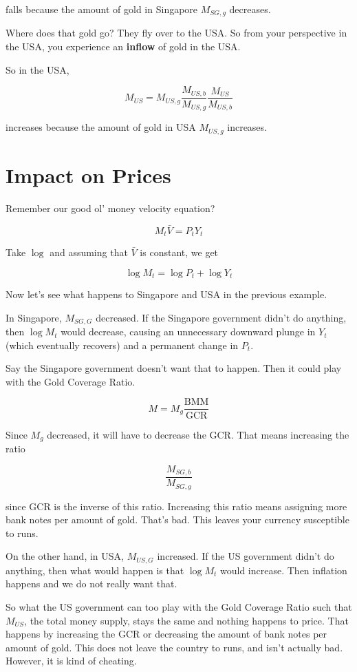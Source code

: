\documentclass[11pt]{scrartcl}
\begin{document}
falls because the amount of gold in Singapore $M_{SG,g}$ decreases. 

Where does that gold go? They fly over to the USA. So from your perspective in the USA, you experience an \textbf{inflow} of gold in the USA.

So in the USA,

\[ M_{US} = M_{US,g} \frac{M_{US,b}}{M_{US,g}} \frac{M_{US}}{M_{US,b}} \] 

increases because the amount of gold in USA $M_{US,g}$ increases.

\section{Impact on Prices}

Remember our good ol' money velocity equation?

\[ M_t \bar{V} = P_t Y_t\]

Take $\log$ and assuming that $\bar{V}$ is constant, we get

\[\log{M_t} = \log{P_t} + \log{Y_t} \]

Now let's see what happens to Singapore and USA in the previous example.

In Singapore, $M_{SG,G}$ decreased. If the Singapore government didn't do anything, then $\log{M_t}$ would decrease, causing an unnecessary downward plunge in $Y_t$ (which eventually recovers) and a permanent change in $P_t$. 

Say the Singapore government doesn't want that to happen. Then it could play with the Gold Coverage Ratio. 

\[  M = M_g \frac{\mathrm{BMM}}{\mathrm{GCR}} \]

Since $M_g$ decreased, it will have to decrease the GCR. That means increasing the ratio

\[  \frac{M_{SG,b}}{M_{SG,g}} \] 

since GCR is the inverse of this ratio. Increasing this ratio means assigning more bank notes per amount of gold. That's bad. This leaves your currency susceptible to runs.

On the other hand, in USA, $M_{US,G}$ increased. If the US government didn't do anything, then what would happen is that $\log{M_t}$ would increase. Then inflation happens and we do not really want that.

So what the US government can too play with the Gold Coverage Ratio such that $M_{US}$, the total money supply, stays the same and nothing happens to price. That happens by increasing the GCR or decreasing the amount of bank notes per amount of gold. This does not leave the country to runs, and isn't actually bad. However, it is kind of cheating. 
\end{document}
